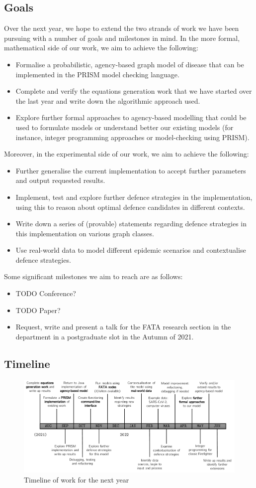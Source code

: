 \documentclass[../report.tex]{subfiles}
\begin{document}
\subsection{Goals}

Over the next year, we hope to extend the two strands of work we have been pursuing with a number of goals and milestones in mind. In the more formal, mathematical side of our work, we aim to achieve the following:
\begin{itemize}
	\item Formalise a probabilistic, agency-based graph model of disease that can be implemented in the PRISM model checking language.
	\item Complete and verify the equations generation work that we have started over the last year and write down the algorithmic approach used.
	\item Explore further formal approaches to agency-based modelling that could be used to formulate models or understand better our existing models (for instance, integer programming approaches or model-checking using PRISM).
\end{itemize}
Moreover, in the experimental side of our work, we aim to achieve the following:
\begin{itemize}
	\item Further generalise the current implementation to accept further parameters and output requested results.
	\item Implement, test and explore further defence strategies in the implementation, using this to reason about optimal defence candidates in different contexts.
	\item Write down a series of (provable) statements regarding defence strategies in this implementation on various graph classes.
	\item Use real-world data to model different epidemic scenarios and contextualise defence strategies.
\end{itemize}

Some significant milestones we aim to reach are as follows:
\begin{itemize}
	\item TODO Conference?
	\item TODO Paper?
	\item Request, write and present a talk for the FATA research section in the department in a postgraduate slot in the Autumn of 2021.
\end{itemize}

\subsection{Timeline}

\begin{figure}[!ht]
\centering\includegraphics[width=\textwidth]{assets/timeline}
\caption{Timeline of work for the next year}
\end{figure}
\end{document}
